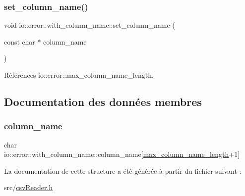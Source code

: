 \subsubsection{\texorpdfstring{set\+\_\+column\+\_\+name()}{set\_column\_name()}}
{\footnotesize\ttfamily void io\+::error\+::with\+\_\+column\+\_\+name\+::set\+\_\+column\+\_\+name (\begin{DoxyParamCaption}\item[{const char $\ast$}]{column\+\_\+name }\end{DoxyParamCaption})\hspace{0.3cm}{\ttfamily [inline]}}



Références io\+::error\+::max\+\_\+column\+\_\+name\+\_\+length.



\subsection{Documentation des données membres}
\mbox{\label{structio_1_1error_1_1with__column__name_af40ba00f1f035d363b099baf1f724323}} 
\subsubsection{\texorpdfstring{column\+\_\+name}{column\_name}}
{\footnotesize\ttfamily char io\+::error\+::with\+\_\+column\+\_\+name\+::column\+\_\+name\mbox{[}\hyperlink{namespaceio_1_1error_ae17181bae477fe72ddad096b6b1d6963}{max\+\_\+column\+\_\+name\+\_\+length}+1\mbox{]}}



La documentation de cette structure a été générée à partir du fichier suivant \+:\begin{DoxyCompactItemize}
\item 
src/\hyperlink{csvReader_8h}{csv\+Reader.\+h}\end{DoxyCompactItemize}
